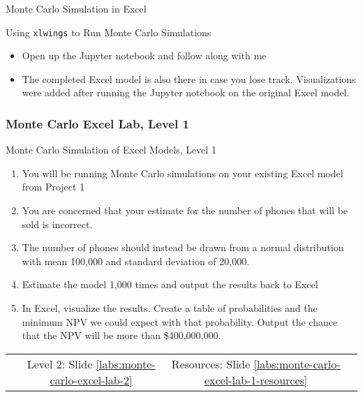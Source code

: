 \documentclass[handout, 11pt]{beamer}
\begin{document}
\begin{section}[Excel MC]{Monte Carlo Simulation in Excel}
\begin{frame}
{\begin{block}{Using \texttt{xlwings} to Run Monte Carlo Simulations}
\begin{itemize}
\item Open up the Jupyter notebook and follow along with me
\item The completed Excel model is also there in case you lose track. Visualizations were added after running the Jupyter notebook on the original Excel model.
\end{itemize}
\end{block}
}
\end{frame}
\begin{frame}
\frametitle{Monte Carlo Excel Lab, Level 1}
{
\begin{block}{Monte Carlo Simulation of Excel Models, Level 1}
\begin{enumerate}
\item You will be running Monte Carlo simulations on your existing Excel model from Project 1
\item You are concerned that your estimate for the number of phones that will be sold is incorrect. 
\item The number of phones should instead be drawn from a normal distribution with mean 100,000 and standard deviation of 20,000.
\item Estimate the model 1,000 times and output the results back to Excel
\item In Excel, visualize the results.  Create a table of probabilities and the minimum NPV we could expect with that probability. Output the chance that the NPV will be more than \$400,000,000.
\end{enumerate}
\vfill
\begin{tabular*}{\textwidth}{@{\extracolsep{\fill}}cccc}
\toprule
\hfill & Level 2: Slide \textcolor{blue}{\underline{\ref{labs:monte-carlo-excel-lab-2}}} & Resources: Slide \textcolor{blue}{\underline{\ref{labs:monte-carlo-excel-lab-1-resources}}} & \hfill\\

\end{tabular*}
\end{block}
}
\label{labs:monte-carlo-excel-lab-1}
\end{frame}
\end{section}
\appendix
{}
\setcounter{finalframe}{\value{framenumber}}
\end{document}
